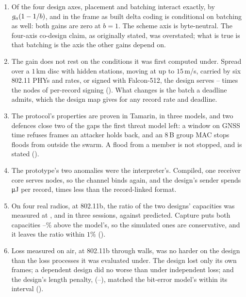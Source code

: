 \begin{enumerate}
\item Of the four design axes, placement and batching interact exactly, by $g_a(1-1/b)$, and in
the frame as built delta coding is conditional on batching as well: both gains are zero at
$b = 1$. The scheme axis is byte-neutral. The four-axis co-design claim, as originally stated,
was overstated; what is true is that batching is the axis the other gains depend on.

\item The gain does not rest on the conditions it was first computed under. Spread over a
$1$\,km disc with hidden stations, moving at up to $15$\,m/s, carried by six 802.11 PHYs and
rates, or signed with Falcon-512, the design serves \phySimRatioLo--\phySimRatioHi{} times the
nodes of per-record signing (). What changes is the batch a deadline admits,
which the design map gives for any record rate and deadline.

\item The protocol's properties are proven in Tamarin, in three models, and two defences close
two of the gaps the first threat model left: a window on GNSS time refuses frames an attacker
holds back, and an $8$\,B group MAC stops floods from outside the swarm. A flood from a member is
not stopped, and is stated ().

\item The prototype's two anomalies were the interpreter's. Compiled, one receiver core serves
\rxRustNodes{} nodes, so the channel binds again, and the design's sender spends
\enRustMeas\,\si{\micro\joule} per record, \enFirstOverRust{} times less than the record-linked format.

\item On four real radios, at 802.11b, the ratio of the two designs' capacities was measured at
\hwRatio, \hwRepeatRatio{} and \hwThirdRatio{} in three sessions, against \hwModelRatio{} predicted.
Capture puts both capacities \hwAboveLo--\hwAboveHi\% above the model's, so the simulated ones are
conservative, and it
leaves the ratio within $1\%$ ().

\item Loss measured on air, at 802.11b through walls, was no harder on the design than the loss
processes it was evaluated under. The design lost only its own frames; a dependent design did no
worse than under independent loss; and the design's length penalty, \airPenalty{}
(\airPenaltyLo--\airPenaltyHi), matched the bit-error model's \airPenaltyModel{} within its
interval ().
\end{enumerate}

